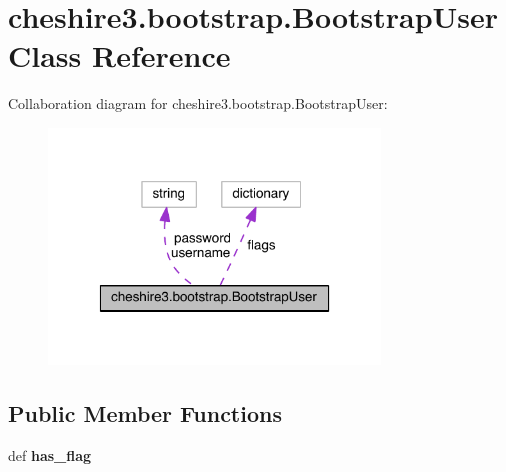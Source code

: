 \hypertarget{classcheshire3_1_1bootstrap_1_1_bootstrap_user}{\section{cheshire3.\-bootstrap.\-Bootstrap\-User Class Reference}
\label{classcheshire3_1_1bootstrap_1_1_bootstrap_user}
}


Collaboration diagram for cheshire3.\-bootstrap.\-Bootstrap\-User\-:
\nopagebreak
\begin{figure}[H]
\begin{center}
\leavevmode
\includegraphics[width=250pt]{classcheshire3_1_1bootstrap_1_1_bootstrap_user__coll__graph}
\end{center}
\end{figure}
\subsection*{Public Member Functions}
\begin{DoxyCompactItemize}
\item 
\hypertarget{classcheshire3_1_1bootstrap_1_1_bootstrap_user_a4e65af40ab078450b7831e5bd9fe6222}{def {\bfseries has\-\_\-flag}}\label{classcheshire3_1_1bootstrap_1_1_bootstrap_user_a4e65af40ab078450b7831e5bd9fe6222}

\end{DoxyCompactItemize}
